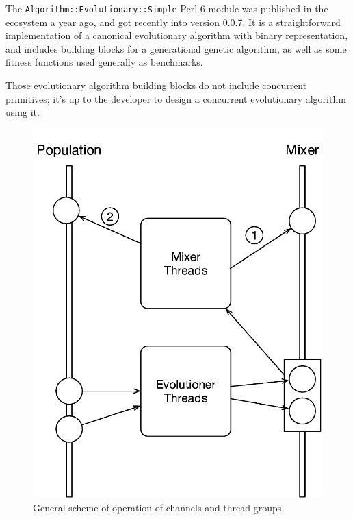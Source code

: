 \documentclass[sigconf]{acmart}\usepackage[]{graphicx}\usepackage[]{color}
\begin{document}
The {\tt Algorithm::Evolutionary::Simple} Perl 6 module was published
in the ecosystem a year ago, and got recently into version 0.0.7. It
is a straightforward implementation of a canonical evolutionary
algorithm with binary representation, and includes building blocks for
a generational genetic algorithm, as well as some fitness functions
used generally as benchmarks.

Those evolutionary algorithm building blocks do not include concurrent
primitives; it's up to the developer to design a concurrent
evolutionary algorithm using it.

\begin{figure}[h!tb]
  \centering
\includegraphics[width=0.95\columnwidth]{../figure/popmixer}
\caption{General scheme of operation of channels and thread groups. }
\label{fig:scheme}
\end{figure}
%
\end{document}
